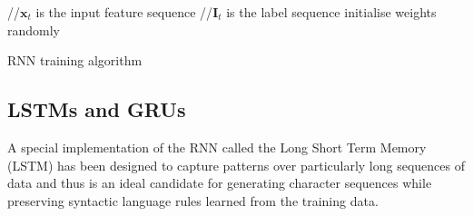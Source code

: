 \begin{algorithm}[H]
\SetAlgoLined
{}
 //$\mathbf{x}_t$ is the input feature sequence
 //$\mathbf{I}_t$ is the label sequence\;
 initialise weights randomly\;
 \caption{RNN training algorithm}
\end{algorithm}

\subsection{LSTMs and GRUs}

A special implementation of the RNN called the Long Short Term Memory (LSTM) has been designed to capture patterns over particularly long sequences of data and thus is an ideal candidate for generating character sequences while preserving syntactic language rules learned from the training data.

